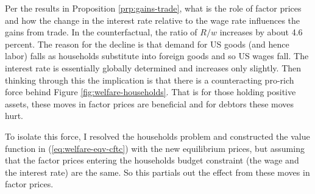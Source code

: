 \documentclass[12pt,pdftex]{article}
\begin{document}
\begin{onehalfspacing}
Per the results in Proposition \ref{prp:gains-trade}, what is the role of factor prices and how the change in the interest rate relative to the wage rate influences the gains from trade. In the counterfactual, the ratio of $R/w$ increases by about 4.6 percent. The reason for the decline is that demand for US goods (and hence labor) falls as households substitute into foreign goods and so US wages fall. The interest rate is essentially globally determined and increases only slightly. Then thinking through this the implication is that there is a counteracting pro-rich force behind Figure \ref{fig:welfare-households}. That is for those holding positive assets, these moves in factor prices are beneficial and for debtors these moves hurt.

To isolate this force, I resolved the households problem and constructed the value function in (\ref{eq:welfare-eqv-cftc}) with the new equilibrium prices, but assuming that the factor prices entering the households budget constraint (the wage and the interest rate) are the same. So this partials out the effect from these moves in factor prices.









%
%


\end{onehalfspacing}
\end{document}
